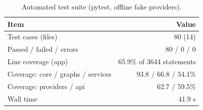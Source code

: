 \begin{table}[t]
\centering
\caption{Automated test suite (pytest, offline fake providers).}
\label{tab:tests}
\footnotesize
\setlength{\tabcolsep}{3.5pt}
\begin{tabular}{lr}
\toprule
Item & Value \\
\midrule
Test cases (files) & 80 (14) \\
Passed / failed / errors & 80 / 0 / 0 \\
Line coverage (app) & 65.9\% of 3644 statements \\
Coverage: core / graphs / services & 93.8 / 66.8 / 54.1\% \\
Coverage: providers / api & 62.7 / 59.5\% \\
Wall time & 41.9 s \\
\bottomrule
\end{tabular}
\end{table}
